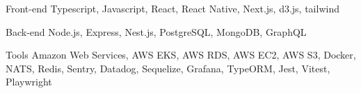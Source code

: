 

\begin{cvskills}

	\cvskill
	{Front-end} %
	{Typescript, Javascript, React, React Native, Next.js, d3.js, tailwind} %

	\cvskill
	{Back-end} %
	{Node.js, Express, Nest.js, PostgreSQL, MongoDB, GraphQL} %

	\cvskill
	{Tools} %
	{Amazon Web Services, AWS EKS,  AWS RDS, AWS EC2, AWS S3, Docker, NATS, Redis, Sentry, Datadog, Sequelize, Grafana, TypeORM, Jest, Vitest, Playwright} %

\end{cvskills}
